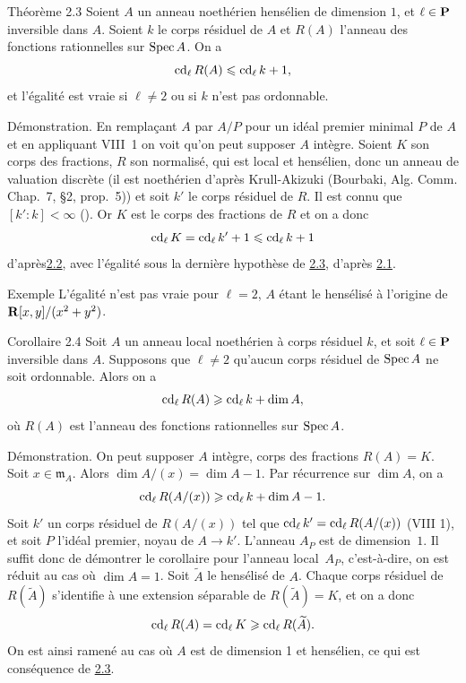 \documentclass[10pt]{../fichiers-configuration-latex/smfart}
\begin{document}
\begin{enonce*}{Théorème 2.3}
Soient $A$ un anneau noethérien hensélien de dimension $1$, et
$\ell\in \mathbf{P}$ inversible dans $A$. Soient $k$ le
corps résiduel de $A$ et $R(A)$ l'anneau des fonctions rationnelles
sur $\operatorname{Spec} A$. On a
$$
\operatorname{cd}_{\ell}R(A)\leqslant \operatorname{cd}_{\ell}k+1{},
$$
et l'égalité est vraie si $\ell\neq 2$ ou si $k$ n'est pas ordonnable.
\end{enonce*}

Démonstration. En remplaçant $A$ par $A/P$ pour un idéal premier
minimal $P$ de $A$ et en appliquant VIII 1 %
on voit qu'on peut supposer $A$ intègre. Soient $K$ son corps des fractions, $R$ son
normalisé, qui est local et hensélien, donc un anneau de valuation
discrète (il est noethérien d'après Krull-Akizuki (Bourbaki,
Alg. Comm. Chap.~7, \S 2, prop.~5)) et soit $k'$ le corps résiduel de
$R$. Il est connu que $[k':k]<\infty$ (\loccit). Or $K$ est le corps
des fractions de $R$ et on a donc
$$
\operatorname{cd}_{\ell}K=\operatorname{cd}_{\ell}k'+1\leqslant \operatorname{cd}_{\ell}k+1
$$
d'après\pageoriginale \hyperref[X.thm2.2]{2.2}, avec l'égalité sous la dernière hypothèse
de \hyperref[X.thm2.3]{2.3}, d'après \hyperref[X.thm2.1]{2.1}.

\begin{enonce*}[remark]{Exemple}
L'égalité n'est pas vraie pour $\ell=2$, $A$ étant le hensélisé à
l'origine de $\mathbf{R}[x,y]/(x^2+y^2)$.
\end{enonce*}

\begin{enonce*}{Corollaire 2.4}
Soit $A$ un anneau local noethérien à corps résiduel $k$, et soit
$\ell\in \mathbf{P}$ inversible dans $A$. Supposons que
$\ell\neq 2$  qu'aucun corps résiduel de $\operatorname{Spec} A$ ne soit
ordonnable. Alors on a
$$
\operatorname{cd}_{\ell}R(A)\geqslant \operatorname{cd}_{\ell}k+\dim A{},
$$
où $R(A)$ est l'anneau des fonctions rationnelles sur $\operatorname{Spec} A$.
\end{enonce*}

Démonstration. On peut supposer $A$ intègre,  corps des fractions
$R(A)=K$. Soit $x\in 𝔪_A$.
Alors $\dim A/(x)=\dim A-1$. Par récurrence sur $\dim A$, on a
$$
\operatorname{cd}_{\ell}R(A/(x))\geqslant \operatorname{cd}_{\ell}k+\dim A-1{}.
$$
Soit $k'$ un corps résiduel de $R(A/(x))$ tel que
$\operatorname{cd}_{\ell}k'=\operatorname{cd}_{\ell}R(A/(x))$ (\cf VIII 1), et soit $P$ %
l'idéal premier, noyau de $A\rightarrow k'$. L'anneau $A_P$ est de dimension $1$.
Il suffit donc de démontrer le corollaire pour l'anneau local $A_P$,
c'est-à-dire, on est réduit au cas où $\dim A=1$. Soit
$\widetilde{A}$ le hensélisé de $A$. Chaque corps résiduel de
$R(\widetilde{A})$ s'identifie à une extension séparable de
$R(\widetilde{A})=K$, et on a donc
$$
\operatorname{cd}_{\ell}R(A)=\operatorname{cd}_{\ell}K\geqslant \operatorname{cd}_{\ell}R(\widetilde{A}){}.
$$
On est ainsi ramené au cas où $A$ est de dimension 1 et hensélien, ce
qui est conséquence de \hyperref[X.thm2.3]{2.3}.
\end{document}
